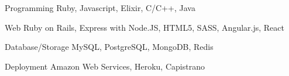 

\begin{cvskills}

  \cvskill
    {Programming} %
    {Ruby, Javascript, Elixir, C/C++, Java} %

  \cvskill
    {Web} %
    {Ruby on Rails, Express with Node.JS, HTML5, SASS, Angular.js, React} %

  \cvskill
    {Database/Storage} %
    {MySQL, PostgreSQL, MongoDB, Redis} %

  \cvskill
    {Deployment} %
    {Amazon Web Services, Heroku, Capistrano} %

\end{cvskills}
